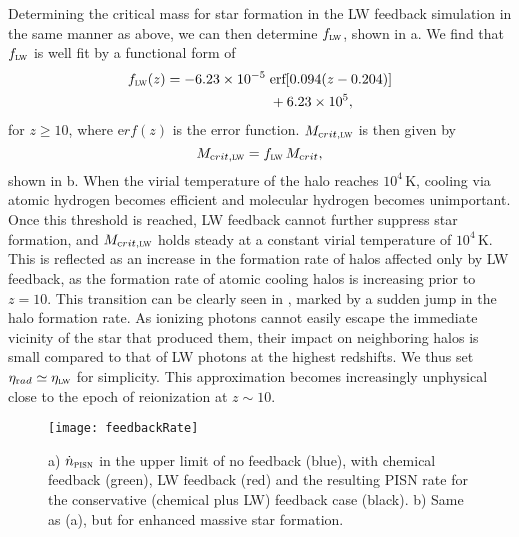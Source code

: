 \documentclass[../thesis.tex]{subfiles}
\begin{document}
Determining the critical mass for star formation in the LW feedback
simulation in the same manner as above, we can then determine
$f_{\textsc{lw}}$, shown in a.  We find that
$f_{\textsc{lw}}$ is well fit by a functional form of
\begin{equation}
  \label{flweq}
  \begin{split}
 f_{\textsc{lw}}(z) = -6.23\times10^{-5} \;
 &\textrm{erf}[0.094 (z - 0.204)] \\
 &+ 6. 23\times10^{5},
 \end{split}
\end{equation}
for $z\geq10$, where ${\mathrm erf}(z)$ is the error function.
$M_{\mathrm crit, \textsc{lw}}$ is then given by
\begin{equation}
  \label{mcritlweq}
M_{\mathrm crit, \textsc{lw}} = f_{\textsc{lw}} \,M_{\mathrm crit},
\end{equation}
shown in b.  When the virial temperature of the
halo reaches $10^4\,$K, cooling via atomic hydrogen becomes efficient
and molecular hydrogen becomes unimportant.  Once this threshold is
reached, LW feedback cannot further suppress star formation, and
$M_{\mathrm crit, \textsc{lw}}$ holds steady at a constant virial
temperature of $10^4\,$K.  This is reflected as an increase in the
formation rate of halos affected only by LW feedback, as the formation
rate of atomic cooling halos is increasing prior to $z=10$.  This
transition can be clearly seen in , marked by a sudden
jump in the halo formation rate.  As ionizing photons cannot easily
escape the immediate vicinity of the star that produced them, their
impact on neighboring halos is small compared to that of LW photons at
the highest redshifts.  We thus set $\eta_{\mathrm rad} \simeq
\eta_{\textsc{lw}}$ for simplicity.  This approximation becomes
increasingly unphysical close to the epoch of reionization at
$z\sim10$.
\begin{figure}
 \begin{center}
   \texttt{[image: feedbackRate]}
   \caption{a) $\dot{n}_{\textsc{pisn}}$ in the upper limit of no
     feedback (blue), with chemical feedback (green), LW feedback
     (red) and the resulting PISN rate for the conservative (chemical
     plus LW) feedback case (black).  b) Same as (a), but for enhanced
     massive star formation.}
   \label{fbrate}
 \end{center}
\end{figure}
\end{document}
